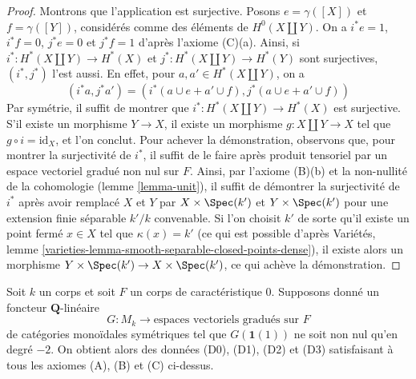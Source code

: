 \begin{proof}
\medskip\noindent
Montrons que l'application est surjective. Posons $e = \gamma([X])$ et $f = \gamma([Y])$,
considérés comme des éléments de $H^0(X \amalg Y)$. On a
$i^*e = 1$, $i^*f = 0$, $j^*e = 0$ et $j^*f = 1$ d'après l'axiome (C)(a).
Ainsi, si $i^* : H^*(X \amalg Y) \to  H^*(X)$
et $j^* : H^*(X \amalg Y) \to H^*(Y)$ sont surjectives,
$(i^*, j^*)$ l'est aussi. En effet, pour $a, a' \in H^*(X \amalg Y)$,
on a
$$
(i^*a, j^*a') = (i^*(a \cup e + a' \cup f), j^*(a \cup e + a' \cup f))
$$
Par symétrie, il suffit de montrer que $i^* : H^*(X \amalg Y) \to  H^*(X)$
est surjective. S'il existe un morphisme $Y \to X$, il existe un morphisme
$g : X \amalg Y \to X$ tel que $g \circ i = \text{id}_X$, et l'on conclut.
Pour achever la démonstration, observons que, pour montrer
la surjectivité de $i^*$, il suffit de le faire après produit tensoriel
par un espace vectoriel gradué non nul sur $F$. Ainsi, par l'axiome (B)(b)
et la non-nullité de la cohomologie (lemme \ref{lemma-unit}),
il suffit de démontrer la surjectivité de $i^*$ après avoir remplacé
$X$ et $Y$ par $X \times \Spec(k')$ et $Y \times \Spec(k')$
pour une extension finie séparable $k'/k$ convenable.
Si l'on choisit $k'$ de sorte qu'il existe un point fermé
$x \in X$ tel que $\kappa(x) = k'$ (ce qui est possible d'après
Variétés, lemme \ref{varieties-lemma-smooth-separable-closed-points-dense}),
il existe alors un morphisme $Y \times \Spec(k') \to X \times \Spec(k')$,
ce qui achève la démonstration.
\end{proof}

\begin{lemma}
\label{lemma-from-functor-to-weil}
Soit $k$ un corps et soit $F$ un corps de caractéristique $0$.
Supposons donné un foncteur $\mathbf{Q}$-linéaire
$$
G : M_k \longrightarrow \text{espaces vectoriels gradués sur }F\text{}
$$
de catégories monoïdales symétriques tel que $G(\mathbf{1}(1))$
ne soit non nul qu'en degré $-2$. On obtient alors des données (D0), (D1), (D2) et (D3)
satisfaisant à tous les axiomes (A), (B) et (C) ci-dessus.
\end{lemma}

